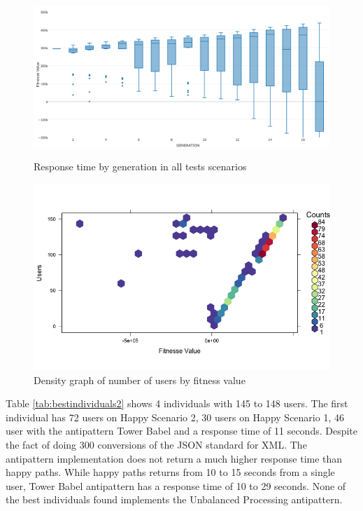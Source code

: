 \begin{figure}[h]
\begin{minipage}{.5\textwidth}
\centering
\includegraphics[width=1\textwidth]{./images/experiment2-3.png}
\caption{Response time by generation in all tests scenarios}
\label{fig:summaryboxplot2}
\end{minipage}
\begin{minipage}{.5\textwidth}
\centering
\includegraphics[width=1\textwidth]{./images/experiment2-4.png}
\caption{Density graph of number of users by fitness value}
\label{fig:density2}
\end{minipage}

\end{figure}

Table \ref{tab:bestindividuals2} shows 4 individuals with 145 to 148 users.  The first individual has 72 users on Happy Scenario 2, 30 users on Happy Scenario 1, 46 user with the antipattern Tower Babel and a response time of 11 seconds. Despite the fact of doing 300 conversions of the JSON standard for XML. The antipattern implementation does not return a much higher response time than happy paths. While happy paths returns from 10 to 15 seconds from a single user, Tower Babel antipattern has a response time of 10 to 29 seconds. None of the best individuals found implements the Unbalanced Processing antipattern.

